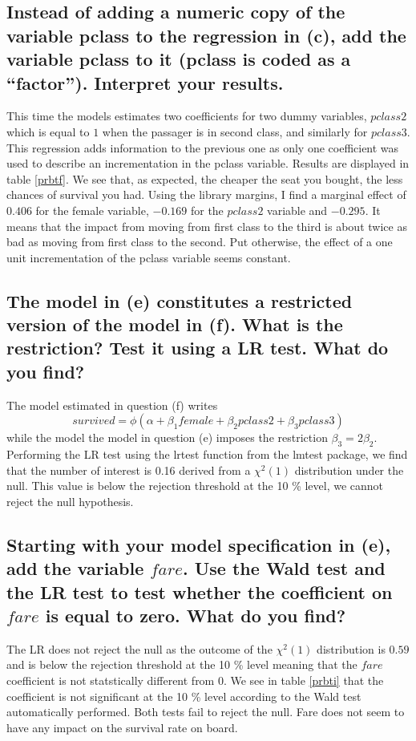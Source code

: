 \documentclass[12pt]{article}
\begin{document}
\subsection{Instead of adding a numeric copy of the variable pclass to the regression in (c), add the variable pclass to it (pclass is coded as a “factor”). Interpret your results.}

This time the models estimates two coefficients for two dummy variables, $pclass2$ which is equal to $1$ when the passager is in second class, and similarly for $pclass3$. This regression adds information to the previous one as only one coefficient was used to describe an incrementation in the pclass variable. Results are displayed in table \ref{prbtf}. We see that, as expected, the cheaper the seat you bought, the less chances of survival you had. Using the library margins, I find a marginal effect of $0.406$ for the female variable, $-0.169$ for the $pclass2$ variable and $-0.295$. It means that the impact from moving from first class to the third is about twice as bad as moving from first class to the second. Put otherwise, the effect of a one unit incrementation of the pclass variable seems constant.

\subsection{The model in (e) constitutes a restricted version of the model in (f). What is the restriction? Test it using a LR test. What do you find?}
The model estimated in question (f) writes
$$survived = \phi(\alpha + \beta_1 female + \beta_2 pclass2 + \beta_3 pclass 3)$$
while the model the model in question (e) imposes the restriction $\beta_3 = 2 \beta_2$.
Performing the LR test using the lrtest function from the lmtest package, we find that the number of interest is 0.16 derived from a $\chi^2(1)$ distribution under the null. This value is below the rejection threshold at the 10 \% level, we cannot reject the null hypothesis.
\subsection{Starting with your model specification in (e), add the variable $fare$. Use the Wald test and the LR test to test whether the coefficient on $fare$ is equal to zero. What do you find?}

The LR does not reject the null as the outcome of the $\chi^2(1)$ distribution is $0.59$ and is below the rejection threshold at the 10 \% level meaning that the $fare$ coefficient is not statstically different from 0. We see in table \ref{prbti} that the coefficient is not significant at the 10 \% level according to the Wald test automatically performed. Both tests fail to reject the null. Fare does not seem to have any impact on the survival rate on board.
\end{document}
